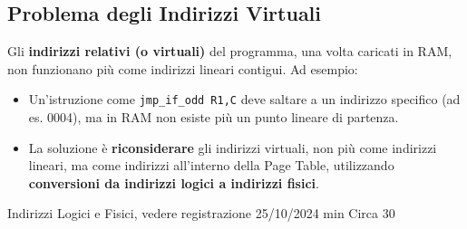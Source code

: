\subsection*{Problema degli Indirizzi Virtuali}
Gli \textbf{indirizzi relativi (o virtuali)} del programma, una volta caricati in RAM, non funzionano più come indirizzi lineari contigui. Ad esempio:
\begin{itemize}
    \item Un'istruzione come \texttt{jmp\_if\_odd R1,C} deve saltare a un indirizzo specifico (ad es. 0004), ma in RAM non esiste più un punto lineare di partenza.
    \item La soluzione è \textbf{riconsiderare} gli indirizzi virtuali, non più come indirizzi lineari, ma come indirizzi all'interno della Page Table, utilizzando \textbf{conversioni da indirizzi logici a indirizzi fisici}.
\end{itemize}


Indirizzi Logici e Fisici, vedere registrazione 25/10/2024 min Circa 30
